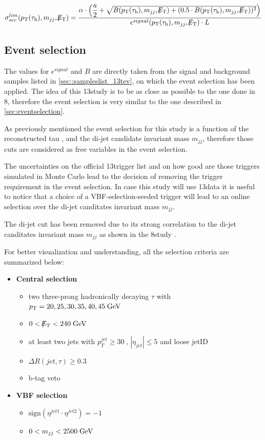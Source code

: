 \begin{equation}
\sigma^{lim}_{sec}( \pt(\hadtau) , m_{jj} ,  \met ) = \dfrac{\alpha \cdot\left(\dfrac{a}{2} + \sqrt{B( \pt(\hadtau) , m_{jj} ,  \met ) + (0.5 \cdot B( \pt(\hadtau) , m_{jj} ,  \met ))^{2}}\right)}{\epsilon^{signal} ( \pt(\hadtau) , m_{jj} ,  \met ) \cdot L}
\label{eq::xsec_lim}
\end{equation}



\subsection{Event selection}
\label{subsec::event_sel_13tev}

The values for $\epsilon^{signal}$ and $B$ are directly taken from the signal and background samples listed in \autoref{sec::sampleslist_13tev}, on which the event selection has been applied. The idea of this 13\tev study is to be as close as possible to the one done in 8\tev, therefore the event selection is very similar to the one described in \autoref{sec:eventselection}.

As previously mentioned the event selection for this study is a function of the reconstructed tau \pt , \met and the di-jet candidate invariant mass $m_{jj}$, therefore those cuts are considered as free variables in the event selection. 

The uncertainties on the official 13\tev trigger list and on how good are those triggers simulated in Monte Carlo lead to the decision of removing the trigger requirement in the event selection. In case this study will use 13\tev data it is useful to notice that a choice of a VBF-selection-seeded trigger will lead to an online selection over the di-jet canditates invariant mass $m_{jj}$.

The di-jet \deltaeta cut has been removed due to its strong correlation to the di-jet canditates invariant mass $m_{jj}$ as shown in the 8\tev study \cite{Khachatryan:2015kxa}.

For better visualization and understanding, all the selection criteria are summarized below:

\begin{itemize}
	\item \textbf{Central selection}
	\begin{itemize}
		\item two three-prong hadronically decaying $\tau$ with $p_{\text{T}} = 20,25,30,35,40,45\;\text{Ge}\kern-0.06667em\text{V}$
		\item $0 < \slash\mkern-12mu{E}_{\text{T}} < 240\;\text{Ge}\kern-0.06667em\text{V}$
		\item at least two jets with $p_{T}^{jet}\geq30~$\gev, $|\eta_{jet}|\leq5$ and loose jetID
		\item $\Delta R(jet,\tau)\geq0.3$
		\item b-tag veto
	\end{itemize}
	\item \textbf{VBF selection}
	\begin{itemize}
		\item $\text{sign}(\eta^{jet 1}\cdot\eta^{jet 2})=-1$
		\item $ 0 < m_{jj} < 2500\;\text{Ge}\kern-0.06667em\text{V}$
	\end{itemize}
\end{itemize}


